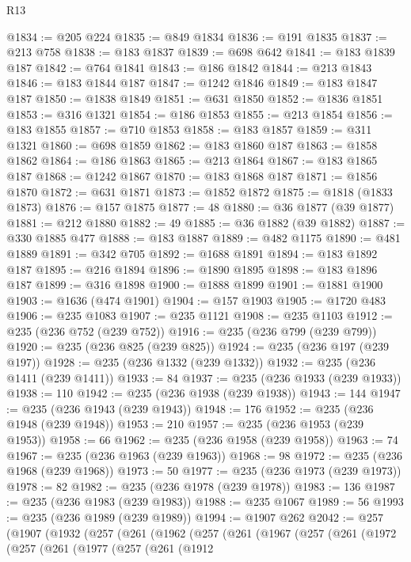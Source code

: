 \begin{lexlean}{R13}
\begin{coremodule}
@1834 := @205 @224
@1835 := @849 @1834
@1836 := @191 @1835
@1837 := @213 @758
@1838 := @183 @1837
@1839 := @698 @642
@1841 := @183 @1839 @187
@1842 := @764 @1841
@1843 := @186 @1842
@1844 := @213 @1843
@1846 := @183 @1844 @187
@1847 := @1242 @1846
@1849 := @183 @1847 @187
@1850 := @1838 @1849
@1851 := @631 @1850
@1852 := @1836 @1851
@1853 := @316 @1321
@1854 := @186 @1853
@1855 := @213 @1854
@1856 := @183 @1855
@1857 := @710 @1853
@1858 := @183 @1857
@1859 := @311 @1321
@1860 := @698 @1859
@1862 := @183 @1860 @187
@1863 := @1858 @1862
@1864 := @186 @1863
@1865 := @213 @1864
@1867 := @183 @1865 @187
@1868 := @1242 @1867
@1870 := @183 @1868 @187
@1871 := @1856 @1870
@1872 := @631 @1871
@1873 := @1852 @1872
@1875 := @1818 (@1833 @1873)
@1876 := @157 @1875
@1877 := 48
@1880 := @36 @1877 (@39 @1877)
@1881 := @212 @1880
@1882 := 49
@1885 := @36 @1882 (@39 @1882)
@1887 := @330 @1885 @477
@1888 := @183 @1887
@1889 := @482 @1175
@1890 := @481 @1889
@1891 := @342 @705
@1892 := @1688 @1891
@1894 := @183 @1892 @187
@1895 := @216 @1894
@1896 := @1890 @1895
@1898 := @183 @1896 @187
@1899 := @316 @1898
@1900 := @1888 @1899
@1901 := @1881 @1900
@1903 := @1636 (@474 @1901)
@1904 := @157 @1903
@1905 := @1720 @483
@1906 := @235 @1083
@1907 := @235 @1121
@1908 := @235 @1103
@1912 := @235 (@236 @752 (@239 @752))
@1916 := @235 (@236 @799 (@239 @799))
@1920 := @235 (@236 @825 (@239 @825))
@1924 := @235 (@236 @197 (@239 @197))
@1928 := @235 (@236 @1332 (@239 @1332))
@1932 := @235 (@236 @1411 (@239 @1411))
@1933 := 84
@1937 := @235 (@236 @1933 (@239 @1933))
@1938 := 110
@1942 := @235 (@236 @1938 (@239 @1938))
@1943 := 144
@1947 := @235 (@236 @1943 (@239 @1943))
@1948 := 176
@1952 := @235 (@236 @1948 (@239 @1948))
@1953 := 210
@1957 := @235 (@236 @1953 (@239 @1953))
@1958 := 66
@1962 := @235 (@236 @1958 (@239 @1958))
@1963 := 74
@1967 := @235 (@236 @1963 (@239 @1963))
@1968 := 98
@1972 := @235 (@236 @1968 (@239 @1968))
@1973 := 50
@1977 := @235 (@236 @1973 (@239 @1973))
@1978 := 82
@1982 := @235 (@236 @1978 (@239 @1978))
@1983 := 136
@1987 := @235 (@236 @1983 (@239 @1983))
@1988 := @235 @1067
@1989 := 56
@1993 := @235 (@236 @1989 (@239 @1989))
@1994 := @1907 @262
@2042 := @257
    (@1907
      (@1932
        (@257
          (@261
            (@1962
              (@257
                (@261
                  (@1967
                    (@257
                      (@261
                        (@1972
                          (@257
                            (@261
                              (@1977
                                (@257
                                  (@261
                                    (@1912

\end{coremodule}
\end{lexlean}

